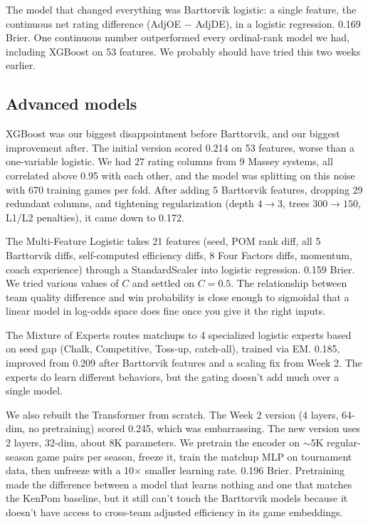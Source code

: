 \documentclass[11pt,a4paper]{article}
\begin{document}
The model that changed everything was Barttorvik logistic: a single feature, the continuous net rating difference (AdjOE $-$ AdjDE), in a logistic regression. 0.169 Brier. One continuous number outperformed every ordinal-rank model we had, including XGBoost on 53 features. We probably should have tried this two weeks earlier.

\subsection{Advanced models}

XGBoost was our biggest disappointment before Barttorvik, and our biggest improvement after. The initial version scored 0.214 on 53 features, worse than a one-variable logistic. We had 27 rating columns from 9 Massey systems, all correlated above 0.95 with each other, and the model was splitting on this noise with 670 training games per fold. After adding 5 Barttorvik features, dropping 29 redundant columns, and tightening regularization (depth $4 \to 3$, trees $300 \to 150$, L1/L2 penalties), it came down to 0.172.

The Multi-Feature Logistic takes 21 features (seed, POM rank diff, all 5 Barttorvik diffs, self-computed efficiency diffs, 8 Four Factors diffs, momentum, coach experience) through a StandardScaler into logistic regression. 0.159 Brier. We tried various values of $C$ and settled on $C = 0.5$. The relationship between team quality difference and win probability is close enough to sigmoidal that a linear model in log-odds space does fine once you give it the right inputs.

The Mixture of Experts routes matchups to 4 specialized logistic experts based on seed gap (Chalk, Competitive, Toss-up, catch-all), trained via EM. 0.185, improved from 0.209 after Barttorvik features and a scaling fix from Week 2. The experts do learn different behaviors, but the gating doesn't add much over a single model.

We also rebuilt the Transformer from scratch. The Week 2 version (4 layers, 64-dim, no pretraining) scored 0.245, which was embarrassing. The new version uses 2 layers, 32-dim, about 8K parameters. We pretrain the encoder on $\sim$5K regular-season game pairs per season, freeze it, train the matchup MLP on tournament data, then unfreeze with a 10$\times$ smaller learning rate. 0.196 Brier. Pretraining made the difference between a model that learns nothing and one that matches the KenPom baseline, but it still can't touch the Barttorvik models because it doesn't have access to cross-team adjusted efficiency in its game embeddings.
\end{document}
